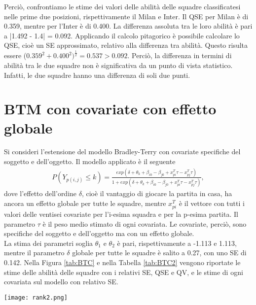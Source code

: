 Perciò, confrontiamo le stime dei valori delle abilità delle squadre classificatesi nelle prime due posizioni, rispettivamente il Milan e Inter. Il QSE per Milan è di 0.359, mentre per l'Inter è di 0.400. La differenza assoluta tra le loro abilità è pari a |1.492 - 1.4| = 0.092. Applicando il calcolo pitagorico è possibile calcolare lo QSE, cioè un SE approssimato, relativo alla differenza tra abilità. Questo risulta essere ($0.359^2 + 0.400^2)^\frac{1}{2}=0.537 > 0.092$. Perciò, la differenza in termini di abilità tra le due squadre non è significativa da un punto di vista statistico. Infatti, le due squadre hanno una differenza di soli due punti.

\section{BTM con covariate con effetto globale}
Si consideri l'estensione del modello Bradley-Terry con covariate specifiche del soggetto e dell'oggetto. Il modello applicato è il seguente
\begin{align}
	P(Y_{p(i,j)}\leq k) =  \frac{exp(\delta + \theta_{k} + \beta_{i0} - \beta_{j0} + x^T_{pi}\tau - x^T_{pj}\tau)}{1 + exp(\delta + \theta_{k} + \beta_{i0} - \beta_{j0} + x^T_{pi}\tau - x^T_{pj}\tau)}, \label{for:5.1}
\end{align}
dove l'effetto dell'ordine $\delta$, cioè il vantaggio di giocare la partita in casa, ha ancora un effetto globale per tutte le squadre, mentre $x^T_{pi}$ è il vettore con tutti i valori delle ventisei covariate per l'i-esima squadra e per la p-esima partita. Il parametro $\tau$ è il peso medio stimato di ogni covariata. Le covariate, perciò, sono specifiche del soggetto e dell'oggetto ma con un effetto globale.\\
La stima dei parametri soglia $\theta_1$ e $\theta_2$ è pari, rispettivamente a -1.113 e 1.113, mentre il parametro $\delta$ globale per tutte le squadre è salito a 0.27, con uno SE di 0.142. Nella Figura \ref{tab:BTC} e nella Tabella \ref{tab:BTC2} vengono riportate le stime delle abilità delle squadre con i relativi SE, QSE e QV, e le stime di ogni covariata sul modello con relativo SE.
	\begin{sidewaysfigure} 
	\centering
	{\texttt{[image: rank2.png]}}\qquad\qquad 
	\caption{Barplot che indica per ogni squadra l'abilità stimata dal modello (\ref{for:5.1}). A fianco al grafico vengono riportati i relativi \emph{Standard 
			Error} (SE), \emph{Quasi Standard Error} (QSE) e \emph{Quasi Variance} (QV). Nel grafico viene indicato con un asterisco le squadre con un piazzamento stimato diverso da quello reale, anche esso riportato a destra del grafico} \label{tab:BTC}  
	
	
\end{sidewaysfigure}

